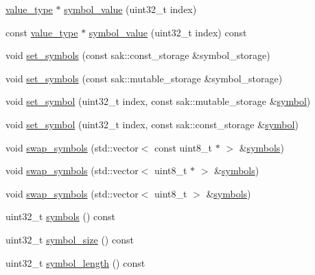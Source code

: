 \begin{DoxyCompactItemize}
\item 
\hyperlink{classlayer_a3ad6d6930927932e5c25f2a2b5277cc0}{value\-\_\-type} $\ast$ \hyperlink{group__storage__api_ga63f5e57701b5499b0d102e25ae691ad9}{symbol\-\_\-value} (uint32\-\_\-t index)
\item 
const \hyperlink{classlayer_a3ad6d6930927932e5c25f2a2b5277cc0}{value\-\_\-type} $\ast$ \hyperlink{group__storage__api_gac7181479f7a80833b57937318d937699}{symbol\-\_\-value} (uint32\-\_\-t index) const 
\item 
void \hyperlink{group__storage__api_gac90a4ce8eb50126267d92059c9e3b1a5}{set\-\_\-symbols} (const sak\-::const\-\_\-storage \&symbol\-\_\-storage)
\item 
void \hyperlink{group__storage__api_ga9ad55409229f2e246ea6e53712d034e4}{set\-\_\-symbols} (const sak\-::mutable\-\_\-storage \&symbol\-\_\-storage)
\item 
void \hyperlink{group__storage__api_ga7f79fae19b4a2fd73d4c2c3c5be1ff7f}{set\-\_\-symbol} (uint32\-\_\-t index, const sak\-::mutable\-\_\-storage \&\hyperlink{group__storage__api_ga576eb5065641dfac94253dbd74b50c99}{symbol})
\item 
void \hyperlink{group__storage__api_ga220f389242643842dfb46105b5a408ff}{set\-\_\-symbol} (uint32\-\_\-t index, const sak\-::const\-\_\-storage \&\hyperlink{group__storage__api_ga576eb5065641dfac94253dbd74b50c99}{symbol})
\item 
void \hyperlink{group__storage__api_ga4bb3abcfff5167bddc7bc28b42ac2fdb}{swap\-\_\-symbols} (std\-::vector$<$ const uint8\-\_\-t $\ast$ $>$ \&\hyperlink{group__storage__api_ga7636faed36a6f85c622102e69fd67c0e}{symbols})
\item 
void \hyperlink{group__storage__api_gaead1a58e30a3d8e673da29f627455efc}{swap\-\_\-symbols} (std\-::vector$<$ uint8\-\_\-t $\ast$ $>$ \&\hyperlink{group__storage__api_ga7636faed36a6f85c622102e69fd67c0e}{symbols})
\item 
void \hyperlink{group__storage__api_ga647716b7e514a63b009c62ee379899eb}{swap\-\_\-symbols} (std\-::vector$<$ uint8\-\_\-t $>$ \&\hyperlink{group__storage__api_ga7636faed36a6f85c622102e69fd67c0e}{symbols})
\item 
uint32\-\_\-t \hyperlink{group__storage__api_ga7636faed36a6f85c622102e69fd67c0e}{symbols} () const 
\item 
uint32\-\_\-t \hyperlink{group__storage__api_gad0fc0dc98e10a49c81d5d08895f94656}{symbol\-\_\-size} () const 
\item 
uint32\-\_\-t \hyperlink{group__storage__api_gad08bdab196333eac6f73e5919bc51366}{symbol\-\_\-length} () const 

\end{DoxyCompactItemize}
